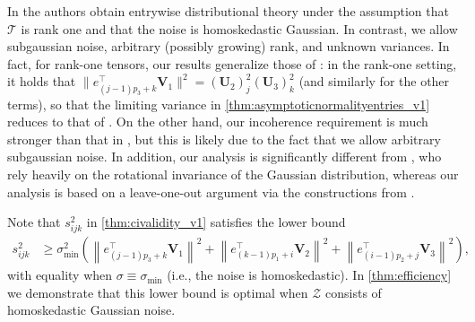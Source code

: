 \documentclass[10pt]{article}
\newcommand{\0}{{\mathbf{0}}}
\newcommand{\1}{{\mathbf{1}}}
\newcommand{\U}{{\mathbf{U}}}
\renewcommand{\citet}{\cite}
\renewcommand{\t}{^{\top}}
\begin{document}
In \citet{xia_inference_2022} the authors obtain entrywise distributional theory under the assumption that $\mathcal{T}$ is rank one and that the noise is homoskedastic Gaussian.  In contrast, we allow subgaussian noise, arbitrary (possibly growing) rank, and unknown variances. In fact, for rank-one tensors, our results generalize those of \cite{xia_inference_2022}: in the rank-one setting, it holds that $\| e_{(j-1)p_3 + k}\t \mathbf{V}_1 \|^2 = (\U_2)_{j}^2 (\U_3)_{k}^2$ (and similarly for the other terms), so that the limiting variance in \cref{thm:asymptoticnormalityentries_v1} reduces to that of \cite{xia_inference_2022}.  On the other hand, our incoherence requirement is much stronger than that in \cite{xia_inference_2022}, but this is likely due to the fact that we allow arbitrary subgaussian noise.  In addition, our analysis is significantly different from \citet{xia_inference_2022}, who rely heavily on the rotational invariance of the Gaussian distribution, whereas our analysis is based on a leave-one-out argument via the constructions from \citet{agterberg_estimating_2022}. 

Note that $s^2_{ijk}$ in \cref{thm:civalidity_v1} satisfies the lower bound
\begin{align*}
    s^2_{ijk} &\geq \sigma^2_{\min}  \left(\left\|e_{(j-1) p_{3}+k}^{\top} \mathbf{V}_{1}\right\|^{2}+\left\|e_{(k-1) p_{1}+i}\t \mathbf{V}_{2}\right\|^{2}+\left\|e_{(i-1) p_{2}+j}\t \mathbf{V}_{3}\right\|^{2}\right),
\end{align*}
with equality when $\sigma \equiv \sigma_{\min}$ (i.e., the noise is homoskedastic).  In \cref{thm:efficiency} we demonstrate that this lower bound is optimal when $\mathcal{Z}$ consists of homoskedastic Gaussian noise.  
\end{document}
